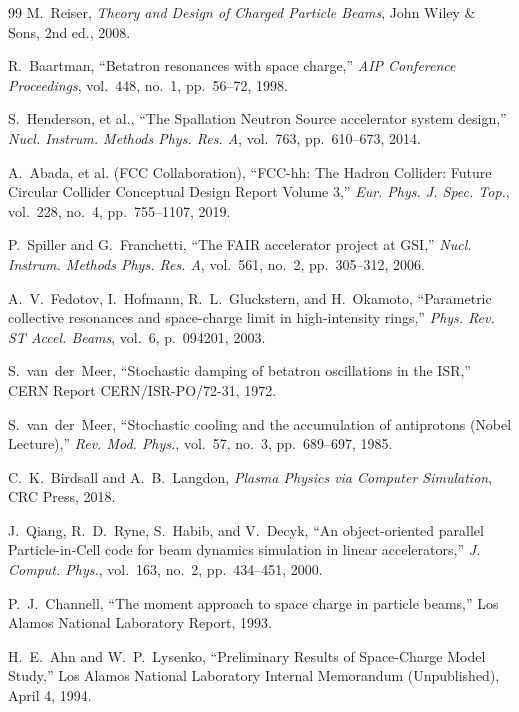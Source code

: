 \documentclass[11pt,a4paper]{article}
\begin{document}
\begin{thebibliography}{99}
M.~Reiser, \emph{Theory and Design of Charged Particle Beams}, John Wiley \& Sons, 2nd ed., 2008.

R.~Baartman, ``Betatron resonances with space charge,'' \emph{AIP Conference Proceedings}, vol.~448, no.~1, pp.~56--72, 1998.

S.~Henderson, et al., ``The Spallation Neutron Source accelerator system design,'' \emph{Nucl. Instrum. Methods Phys. Res. A}, vol.~763, pp.~610--673, 2014.

A.~Abada, et al. (FCC Collaboration), ``FCC-hh: The Hadron Collider: Future Circular Collider Conceptual Design Report Volume 3,'' \emph{Eur. Phys. J. Spec. Top.}, vol.~228, no.~4, pp.~755--1107, 2019.

P.~Spiller and G.~Franchetti, ``The FAIR accelerator project at GSI,'' \emph{Nucl. Instrum. Methods Phys. Res. A}, vol.~561, no.~2, pp.~305--312, 2006.

A.~V.~Fedotov, I.~Hofmann, R.~L.~Gluckstern, and H.~Okamoto, ``Parametric collective resonances and space-charge limit in high-intensity rings,'' \emph{Phys. Rev. ST Accel. Beams}, vol.~6, p.~094201, 2003.

S.~van~der~Meer, ``Stochastic damping of betatron oscillations in the ISR,'' CERN Report CERN/ISR-PO/72-31, 1972.

S.~van~der~Meer, ``Stochastic cooling and the accumulation of antiprotons (Nobel Lecture),'' \emph{Rev. Mod. Phys.}, vol.~57, no.~3, pp.~689--697, 1985.

C.~K.~Birdsall and A.~B.~Langdon, \emph{Plasma Physics via Computer Simulation}, CRC Press, 2018.

J.~Qiang, R.~D.~Ryne, S.~Habib, and V.~Decyk, ``An object-oriented parallel Particle-in-Cell code for beam dynamics simulation in linear accelerators,'' \emph{J. Comput. Phys.}, vol.~163, no.~2, pp.~434--451, 2000.

P.~J.~Channell, ``The moment approach to space charge in particle beams,'' Los Alamos National Laboratory Report, 1993.

H.~E.~Ahn and W.~P.~Lysenko, ``Preliminary Results of Space-Charge Model Study,'' Los Alamos National Laboratory Internal Memorandum (Unpublished), April 4, 1994.
\end{thebibliography}
\end{document}
